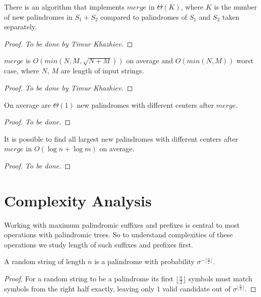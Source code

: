 \begin{lemma}
There is an algorithm that implements $merge$ in $\Theta(K)$,
where $K$ is the number of new palindromes in $S_1 + S_2$
compared to palindromes of $S_1$ and $S_2$ taken separately.
\end{lemma}
\begin{proof}
  \emph{To be done by Timur Khazhiev.}
\end{proof}

\begin{theorem}
$merge$ is $O(min(N, M, \sqrt{N+M}))$ on average
and $O(min(N, M))$ worst case, where $N$, $M$
are length of input strings.
\end{theorem}
\begin{proof}
  \emph{To be done by Timur Khazhiev.}
\end{proof}

\begin{proposition}
On average are $\Theta(1)$ new palindromes with different
centers after $merge$.
\end{proposition}
\begin{proof}
  \emph{To be done.}
\end{proof}

\begin{proposition}
It is possible to find all largest new palindromes with different
centers after $merge$ in $O(\log{} n + \log{} m)$ on average.
\end{proposition}
\begin{proof}
  \emph{To be done.}
\end{proof}

\section{Complexity Analysis}

Working with maximum palindromic suffixes and prefixes
is central to most operations with palindromic trees.
So to understand complexities of these operations we
study length of such suffixes and prefixes first.

\begin{lemma}
\label{lemma-palindrome-prob}
  A random string of length $n$ is a palindrome with probability $\sigma^{- \lfloor\frac{n}{2}\rfloor}$.
\end{lemma}
\begin{proof}
  For a random string to be a palindrome its first $\lfloor\frac{n}{2}\rfloor$
  symbols must match symbols from the right half exactly, leaving only
  $1$ valid candidate out of $\sigma^{\lfloor\frac{n}{2}\rfloor}$.
\end{proof}


